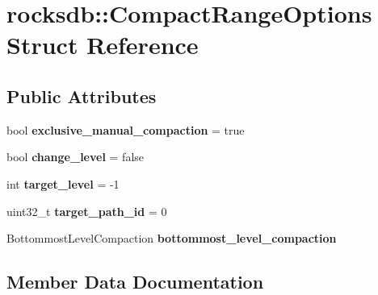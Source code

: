 \hypertarget{structrocksdb_1_1CompactRangeOptions}{}\section{rocksdb\+:\+:Compact\+Range\+Options Struct Reference}
\label{structrocksdb_1_1CompactRangeOptions}
\subsection*{Public Attributes}
\begin{DoxyCompactItemize}
\item 
bool {\bfseries exclusive\+\_\+manual\+\_\+compaction} = true\hypertarget{structrocksdb_1_1CompactRangeOptions_a1fa8654fb45c82afe30dd32fe1247ca3}{}\label{structrocksdb_1_1CompactRangeOptions_a1fa8654fb45c82afe30dd32fe1247ca3}

\item 
bool {\bfseries change\+\_\+level} = false\hypertarget{structrocksdb_1_1CompactRangeOptions_a8334133e9494c0623e26966819b76cda}{}\label{structrocksdb_1_1CompactRangeOptions_a8334133e9494c0623e26966819b76cda}

\item 
int {\bfseries target\+\_\+level} = -\/1\hypertarget{structrocksdb_1_1CompactRangeOptions_ada8c840979d9c9a72876014313242505}{}\label{structrocksdb_1_1CompactRangeOptions_ada8c840979d9c9a72876014313242505}

\item 
uint32\+\_\+t {\bfseries target\+\_\+path\+\_\+id} = 0\hypertarget{structrocksdb_1_1CompactRangeOptions_a64a7e85042f0ef5b9196566ad82afc91}{}\label{structrocksdb_1_1CompactRangeOptions_a64a7e85042f0ef5b9196566ad82afc91}

\item 
Bottommost\+Level\+Compaction {\bfseries bottommost\+\_\+level\+\_\+compaction}
\end{DoxyCompactItemize}


\subsection{Member Data Documentation}
